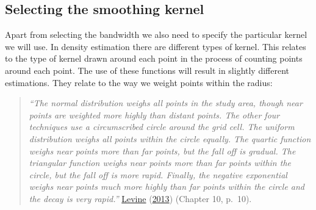 \documentclass[
  krantz2]{krantz}
\begin{document}
\hypertarget{selecting-the-smoothing-kernel}{%
\subsection{Selecting the smoothing kernel}\label{selecting-the-smoothing-kernel}}

Apart from selecting the bandwidth we also need to specify the particular kernel we will use. In density estimation there are different types of kernel. This relates to the type of kernel drawn around each point in the process of counting points around each point. The use of these functions will result in slightly different estimations. They relate to the way we weight points within the radius:

\begin{quote}
\emph{``The normal distribution weighs all points in the study area, though near points are weighted more highly than distant points. The other four techniques use a circumscribed circle around the grid cell. The uniform distribution weighs all points within the circle equally. The quartic function weighs near points more than far points, but the fall off is gradual. The triangular function weighs near points more than far points within the circle, but the fall off is more rapid. Finally, the negative exponential weighs near points much more highly than far points within the circle and the decay is very rapid.''} \protect\hyperlink{ref-Levine_2013}{Levine} (\protect\hyperlink{ref-Levine_2013}{2013}) (Chapter 10, p.~10).
\end{quote}
\end{document}
